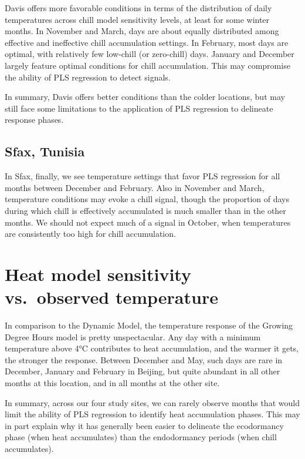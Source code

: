 \documentclass[
]{book}
\begin{document}
Davis offers more favorable conditions in terms of the distribution of daily temperatures across chill model sensitivity levels, at least for some winter months. In November and March, days are about equally distributed among effective and ineffective chill accumulation settings. In February, most days are optimal, with relatively few low-chill (or zero-chill) days. January and December largely feature optimal conditions for chill accumulation. This may compromise the ability of PLS regression to detect signals.

In summary, Davis offers better conditions than the colder locations, but may still face some limitations to the application of PLS regression to delineate response phases.

\hypertarget{sfax-tunisia}{%
\subsection{Sfax, Tunisia}\label{sfax-tunisia}}

In Sfax, finally, we see temperature settings that favor PLS regression for all months between December and February. Also in November and March, temperature conditions may evoke a chill signal, though the proportion of days during which chill is effectively accumulated is much smaller than in the other months. We should not expect much of a signal in October, when temperatures are consistently too high for chill accumulation.

\hypertarget{heat-model-sensitivity-vs.-observed-temperature}{%
\section{Heat model sensitivity vs.~observed temperature}\label{heat-model-sensitivity-vs.-observed-temperature}}

In comparison to the Dynamic Model, the temperature response of the Growing Degree Hours model is pretty unspectacular. Any day with a minimum temperature above 4°C contributes to heat accumulation, and the warmer it gets, the stronger the response. Between December and May, such days are rare in December, January and February in Beijing, but quite abundant in all other months at this location, and in all months at the other site.

In summary, across our four study sites, we can rarely observe months that would limit the ability of PLS regression to identify heat accumulation phases. This may in part explain why it has generally been easier to delineate the ecodormancy phase (when heat accumulates) than the endodormancy periods (when chill accumulates).
\end{document}
